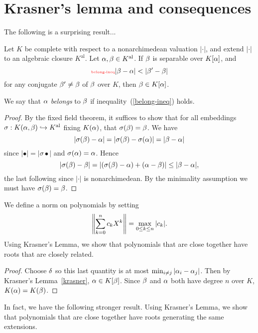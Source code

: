 \section{Krasner's lemma and consequences}
The following is a surprising result... 
\begin{lem}
Let $K$ be complete with respect to a nonarchimedean valuation $|\cdot|$, and extend $|\cdot|$ to an algebraic closure $K^{\text{al}}$. Let $\alpha,\beta\in K^{\text{al}}$. If $\beta$ is separable over $K[\alpha]$, and
\begin{equation}\llabel{belong-ineq}
|\be-\al|<|\be'-\be|
\end{equation}
for any conjugate $\beta'\ne \beta$ of $\beta$ over $K$, then $\beta\in K[\alpha]$.
\end{lem}
We say that $\alpha$ {\it belongs} to $\beta$ if inequality~(\ref{belong-ineq}) holds.
\begin{proof}
By the fixed field theorem, it suffices to show that for all embeddings $\sigma:K(\alpha,\beta)\hookrightarrow K^{\text{al}}$ fixing $K(\alpha)$, that $\sigma(\beta)=\beta$. We have
\[
|\sigma(\beta)-\alpha|=|\sigma(\beta)-\sigma(\alpha)|=|\beta-\alpha|
\]
since $|\bullet|=|\sigma \bullet|$ and $\sigma(\alpha)=\alpha$. Hence
\[
|\sigma(\beta)-\beta|=|(\sigma(\beta)-\alpha)+(\alpha-\beta)|\le |\beta-\alpha|,
\]
the last following since $|\cdot|$ is nonarchimedean. By the minimality assumption we must have $\sigma(\beta)=\beta$.
\end{proof}
We define a norm on polynomials by setting
\[
\left\Vert {\sum_{k=0}^n c_kX^k}\right\Vert=\max_{0\le k\le n} |c_k|.
\]
Using Krasner's Lemma, we show that polynomials that are close together have roots that are closely related.
\begin{proof}
 Choose $\delta$ so this last quantity is at most $\min_{i\ne j} |\alpha_i-\alpha_j|$. Then by Krasner's Lemma~\ref{krasner}, $\alpha\in K[\beta]$. Since $\beta$ and $\alpha$ both have degree $n$ over $K$, $K(\alpha)=K(\beta)$.
\end{proof}
In fact, we have the following stronger result.
Using Krasner's Lemma, we show that polynomials that are close together have roots generating the same extensions.
